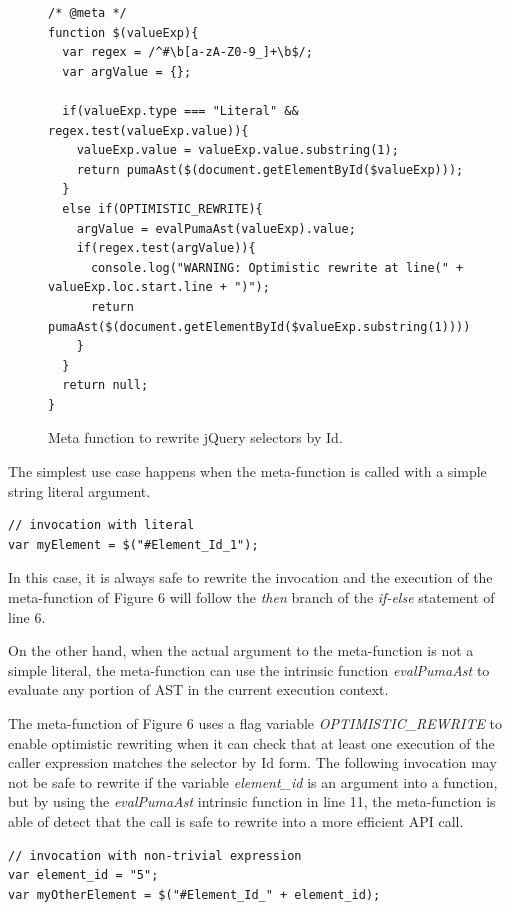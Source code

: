 \documentclass[preprint,10pt]{sigplanconf}
\begin{document}
\begin{figure}
\begin{lstlisting}
/* @meta */
function $(valueExp){
  var regex = /^#\b[a-zA-Z0-9_]+\b$/;
  var argValue = {};
  
  if(valueExp.type === "Literal" && regex.test(valueExp.value)){
    valueExp.value = valueExp.value.substring(1);
    return pumaAst($(document.getElementById($valueExp)));   
  } 
  else if(OPTIMISTIC_REWRITE){
    argValue = evalPumaAst(valueExp).value;   
    if(regex.test(argValue)){
      console.log("WARNING: Optimistic rewrite at line(" + valueExp.loc.start.line + ")");
      return pumaAst($(document.getElementById($valueExp.substring(1))));
    }
  }
  return null;
}
\end{lstlisting}
\caption{Meta function to rewrite jQuery selectors by Id.}
\label{fig:6}
\end{figure}

The simplest use case happens when the meta-function is called with a simple string literal argument. 

\begin{lstlisting}
// invocation with literal
var myElement = $("#Element_Id_1");
\end{lstlisting}

In this case, it is always safe to rewrite the invocation and the execution of the meta-function of Figure 6 will follow the \emph{then} branch of the \emph{if-else} statement of line 6.

On the other hand, when the actual argument to the meta-function is not a simple literal, the meta-function can use the intrinsic function \emph{evalPumaAst} to evaluate any portion of AST in the current execution context. 

The meta-function of Figure 6 uses a flag variable \emph{OPTIMISTIC\_REWRITE} to enable optimistic rewriting when it can check that at least one execution of the caller expression matches the selector by Id form. The following invocation may not be safe to rewrite if the variable \emph{element\_id} is an argument into a function, but by using the \emph{evalPumaAst} intrinsic function in line 11, the meta-function is able of detect that the call is safe to rewrite into a more efficient API call.

\begin{lstlisting}
// invocation with non-trivial expression
var element_id = "5";
var myOtherElement = $("#Element_Id_" + element_id);
\end{lstlisting}
\end{document}
